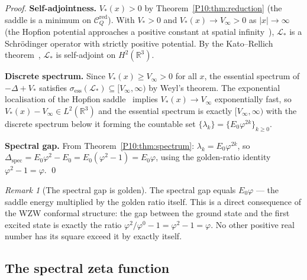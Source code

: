 \documentclass[11pt,a4paper]{article}
\theoremstyle{definition}
\theoremstyle{remark}
\newtheorem{remark}[theorem]{Remark}
\newcommand{\vp}{\varphi}
\newcommand{\RR}{\mathbb{R}}
\newcommand{\CQr}{\mathcal{C}_Q^{\mathrm{red}}}
\begin{document}
\begin{proof}
\textbf{Self-adjointness.}
$V_*(x)>0$ by Theorem~\ref{P10:thm:reduction} (the saddle is a
minimum on $\CQr$).
With $V_*>0$ and $V_*(x)\to V_\infty>0$ as $|x|\to\infty$
(the Hopfion potential approaches a positive constant at spatial
infinity~\cite{Paper1}), $\mathcal{L}_*$ is a Schr\"{o}dinger
operator with strictly positive potential.
By the Kato--Rellich theorem~\cite{ReedSimon1975}, $\mathcal{L}_*$
is self-adjoint on $H^2(\RR^3)$.

\textbf{Discrete spectrum.}
Since $V_*(x) \geq V_\infty > 0$ for all $x$, the essential spectrum
of $-\Delta + V_*$ satisfies $\sigma_\mathrm{ess}(\mathcal{L}_*) \subseteq
[V_\infty,\infty)$ by Weyl's theorem.
The exponential localisation of the Hopfion saddle~\cite{Paper1}
implies $V_*(x) \to V_\infty$ exponentially fast, so
$V_*(x) - V_\infty \in L^2(\RR^3)$ and the essential spectrum is
exactly $[V_\infty,\infty)$ with the discrete spectrum below it forming
the countable set $\{\lambda_k\} = \{E_0\vp^{2k}\}_{k\geq0}$.

\textbf{Spectral gap.}
From Theorem~\ref{P10:thm:spectrum}: $\lambda_k = E_0\vp^{2k}$, so
$\Delta_\mathrm{spec} = E_0\vp^2 - E_0 = E_0(\vp^2-1) = E_0\vp$,
using the golden-ratio identity $\vp^2 - 1 = \vp$.
\qed
\end{proof}

\begin{remark}[The spectral gap is golden]
\label{P10:rem:spectral_gap_golden}
The spectral gap equals $E_0\vp$ --- the saddle energy multiplied by the
golden ratio itself.
This is a direct consequence of the WZW conformal structure:
the gap between the ground state and the first excited state is
exactly the ratio $\vp^2/\vp^0 - 1 = \vp^2 - 1 = \vp$.
No other positive real number has its square exceed it by exactly itself.
\end{remark}

\subsection{The spectral zeta function}
\end{document}
